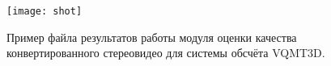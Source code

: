 \begin{figure}[!h]
	\begin{minipage}[b]{1.0\linewidth}
		\centering
		\centerline{ \texttt{[image: shot]} }
	\end{minipage}
    \caption{Пример файла результатов работы модуля оценки качества 
    	конвертированного стереовидео для системы обсчёта VQMT3D.}
	\label{fig:depth_map_example}
\end{figure}
